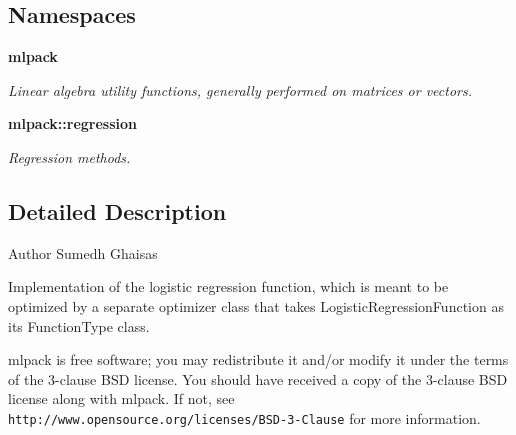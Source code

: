 \subsection*{Namespaces}
\begin{DoxyCompactItemize}
\item 
 {\bf mlpack}
\begin{DoxyCompactList}\small\item\em Linear algebra utility functions, generally performed on matrices or vectors. \end{DoxyCompactList}\item 
 {\bf mlpack\+::regression}
\begin{DoxyCompactList}\small\item\em Regression methods. \end{DoxyCompactList}\end{DoxyCompactItemize}


\subsection{Detailed Description}
\begin{DoxyAuthor}{Author}
Sumedh Ghaisas
\end{DoxyAuthor}
Implementation of the logistic regression function, which is meant to be optimized by a separate optimizer class that takes Logistic\+Regression\+Function as its Function\+Type class.

mlpack is free software; you may redistribute it and/or modify it under the terms of the 3-\/clause B\+SD license. You should have received a copy of the 3-\/clause B\+SD license along with mlpack. If not, see {\tt http\+://www.\+opensource.\+org/licenses/\+B\+S\+D-\/3-\/\+Clause} for more information. 